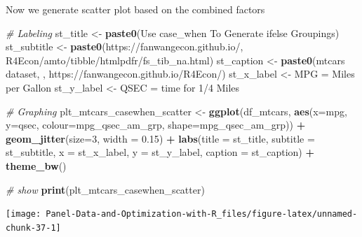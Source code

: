 \documentclass[
]{book}
\newenvironment{Shaded}{\begin{snugshade}}{\end{snugshade}}
\newcommand{\CommentTok}[1]{\textcolor[rgb]{0.56,0.35,0.01}{\textit{#1}}}
\newcommand{\DataTypeTok}[1]{\textcolor[rgb]{0.13,0.29,0.53}{#1}}
\newcommand{\DecValTok}[1]{\textcolor[rgb]{0.00,0.00,0.81}{#1}}
\newcommand{\FloatTok}[1]{\textcolor[rgb]{0.00,0.00,0.81}{#1}}
\newcommand{\KeywordTok}[1]{\textcolor[rgb]{0.13,0.29,0.53}{\textbf{#1}}}
\newcommand{\NormalTok}[1]{#1}
\newcommand{\OperatorTok}[1]{\textcolor[rgb]{0.81,0.36,0.00}{\textbf{#1}}}
\newcommand{\StringTok}[1]{\textcolor[rgb]{0.31,0.60,0.02}{#1}}
\begin{document}
Now we generate scatter plot based on the combined factors

\begin{Shaded}
\begin{Highlighting}[]
\CommentTok{\# Labeling}
\NormalTok{st\_title \textless{}{-}}\StringTok{ }\KeywordTok{paste0}\NormalTok{(}\StringTok{\textquotesingle{}Use case\_when To Generate ifelse Groupings\textquotesingle{}}\NormalTok{)}
\NormalTok{st\_subtitle \textless{}{-}}\StringTok{ }\KeywordTok{paste0}\NormalTok{(}\StringTok{\textquotesingle{}https://fanwangecon.github.io/\textquotesingle{}}\NormalTok{,}
                      \StringTok{\textquotesingle{}R4Econ/amto/tibble/htmlpdfr/fs\_tib\_na.html\textquotesingle{}}\NormalTok{)}
\NormalTok{st\_caption \textless{}{-}}\StringTok{ }\KeywordTok{paste0}\NormalTok{(}\StringTok{\textquotesingle{}mtcars dataset, \textquotesingle{}}\NormalTok{,}
                     \StringTok{\textquotesingle{}https://fanwangecon.github.io/R4Econ/\textquotesingle{}}\NormalTok{)}
\NormalTok{st\_x\_label \textless{}{-}}\StringTok{ \textquotesingle{}MPG = Miles per Gallon\textquotesingle{}}
\NormalTok{st\_y\_label \textless{}{-}}\StringTok{ \textquotesingle{}QSEC = time for 1/4 Miles\textquotesingle{}}

\CommentTok{\# Graphing}
\NormalTok{plt\_mtcars\_casewhen\_scatter \textless{}{-}}\StringTok{ }
\StringTok{  }\KeywordTok{ggplot}\NormalTok{(df\_mtcars, }
         \KeywordTok{aes}\NormalTok{(}\DataTypeTok{x=}\NormalTok{mpg, }\DataTypeTok{y=}\NormalTok{qsec, }
             \DataTypeTok{colour=}\NormalTok{mpg\_qsec\_am\_grp, }
             \DataTypeTok{shape=}\NormalTok{mpg\_qsec\_am\_grp)) }\OperatorTok{+}
\StringTok{  }\KeywordTok{geom\_jitter}\NormalTok{(}\DataTypeTok{size=}\DecValTok{3}\NormalTok{, }\DataTypeTok{width =} \FloatTok{0.15}\NormalTok{) }\OperatorTok{+}
\StringTok{  }\KeywordTok{labs}\NormalTok{(}\DataTypeTok{title =}\NormalTok{ st\_title, }\DataTypeTok{subtitle =}\NormalTok{ st\_subtitle,}
       \DataTypeTok{x =}\NormalTok{ st\_x\_label, }\DataTypeTok{y =}\NormalTok{ st\_y\_label, }\DataTypeTok{caption =}\NormalTok{ st\_caption) }\OperatorTok{+}
\StringTok{  }\KeywordTok{theme\_bw}\NormalTok{()}

\CommentTok{\# show}
\KeywordTok{print}\NormalTok{(plt\_mtcars\_casewhen\_scatter)}
\end{Highlighting}
\end{Shaded}

\begin{center}\texttt{[image: Panel-Data-and-Optimization-with-R\_files/figure-latex/unnamed-chunk-37-1]} \end{center}
\end{document}
